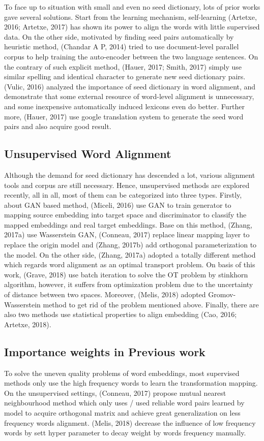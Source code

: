		To face up to situation with small and even no seed dictionary, lots of prior works gave several solutions. Start from the learning mechanism, self-learning (Artetxe, 2016; Artetxe, 2017) has shown its power to align the words with little supervised data. On the other side, motivated by finding seed pairs automatically by heuristic method, (Chandar A P, 2014) tried to use document-level parallel corpus to help training the auto-encoder between the two language sentences. On the contrary of such explicit method, (Hauer, 2017; Smith, 2017) simply use similar spelling and identical character to generate new seed dictionary pairs. (Vulic, 2016) analyzed the importance of seed dictionary in word alignment, and demonstrate that some external resource of word-level alignment is unnecessary, and some inexpensive automatically induced lexicons even do better. Further more, (Hauer, 2017) use google translation system to generate the seed word pairs and also acquire good result.


	\subsection{Unsupervised Word Alignment}
		Although the demand for seed dictionary has descended a lot, various alignment tools and corpus are still necessary. Hence, unsupervised methods are explored recently, all in all, most of them can be categorized into three types. Firstly, about GAN based method, (Miceli, 2016) use GAN to train generator to mapping source embedding into target space and discriminator to classify the mapped embeddings and real target embeddings. Base on this method, (Zhang, 2017a) use Wasserstein GAN, (Conneau, 2017) replace linear mapping layer to replace the origin model and (Zhang, 2017b) add orthogonal parameterization to the model. On the other side, (Zhang, 2017a) adopted a totally different method which regards word alignment as an optimal transport problem. On basis of this work, (Grave, 2018) use batch iteration to solve the OT problem by stinkhorn algorithm, however, it suffers from optimization problem due to the uncertainty of distance between two spaces. Moreover, (Melis, 2018) adopted Gromov-Wasserstein method to get rid of the problem mentioned above. Finally, there are also two methods use statistical properties to align embedding (Cao, 2016; Artetxe, 2018). 


	\subsection{Importance weights in Previous work}
		To solve the uneven quality problems of word embeddings, most supervised methods only use the high frequency words to learn the transformation mapping. On the unsupervised settings, (Conneau, 2017) propose mutual nearest neighbourhood method which only uses / used reliable word pairs learned by model to acquire orthogonal matrix and achieve great generalization on less frequency words alignment. (Melis, 2018) decrease the influence of low frequency words by sett hyper parameter to decay weight by words frequency manually. 


		


